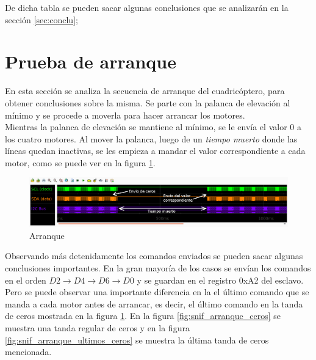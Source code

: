 \documentclass[spanish,12pt,a4paper,titlepage]{report}
\begin{document}
De dicha tabla se pueden sacar algunas conclusiones que se analizarán en la sección \ref{sec:conclu};

\section{Prueba de arranque}
\label{sec:arranque}

En esta sección se analiza la secuencia de arranque del cuadricóptero, para obtener conclusiones sobre la misma. Se parte con la palanca de elevación al mínimo y se procede a moverla para hacer arrancar los motores.\\

Mientras la palanca de elevación se mantiene al mínimo, se le envía el valor 0 a los cuatro motores. Al mover la palanca, luego de un \emph{tiempo muerto} donde las líneas quedan inactivas, se les empieza a mandar el valor correspondiente a cada motor, como se puede ver en la figura \ref{fig:snif_arranque_lejos}.

\begin{figure}[h!]
	\centering
	\includegraphics[width=1\textwidth]{./pics/snif_arranque_lejos.png}
	\caption{Arranque}
	\label{fig:snif_arranque_lejos}
\end{figure}

Observando más detenidamente los comandos enviados se pueden sacar algunas conclusiones importantes. En la gran mayoría de los casos se envían los comandos en el orden $D2\rightarrow D4\rightarrow D6\rightarrow D0$ y se guardan en el registro 0xA2 del esclavo. Pero se puede observar una importante diferencia en la el último comando que se manda a cada motor antes de arrancar, es decir, el último comando en la tanda de ceros mostrada en la figura \ref{fig:snif_arranque_lejos}. En la figura \ref{fig:snif_arranque_ceros} se muestra una tanda regular de ceros y en la figura \ref{fig:snif_arranque_ultimos_ceros} se muestra la última tanda de ceros mencionada.\\
\end{document}
